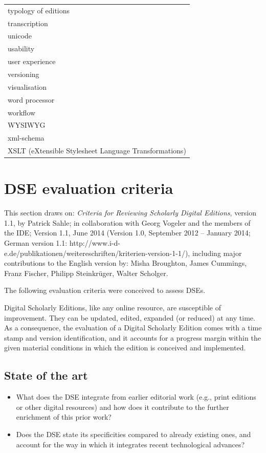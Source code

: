 \documentclass[
  letterpaper,
  DIV=11,
  numbers=noendperiod]{scrreprt}
\begin{document}
\begin{longtable}[]{@{}
  >{\raggedright\arraybackslash}p{}@{}}
typology of editions \\
transcription \\
unicode \\
usability \\
user experience \\
versioning \\
visualisation \\
word processor \\
workflow \\
WYSIWYG~ \\
xml-schema \\
XSLT (eXtensible Stylesheet Language Transformations) \\
\end{longtable}

\section{DSE evaluation criteria}\label{dse-evaluation-criteria}

This section draws on: \emph{Criteria for Reviewing Scholarly Digital
Editions}, version 1.1, by Patrick Sahle; in collaboration with Georg
Vogeler and the members of the IDE; Version 1.1, June 2014 (Version 1.0,
September 2012 -- January 2014; German version 1.1:
http://www.i-d-e.de/publikationen/weitereschriften/kriterien-version-1-1/),
including major contributions to the English version by: Misha
Broughton, James Cummings, Franz Fischer, Philipp Steinkrüger, Walter
Scholger.

The following evaluation criteria were conceived to assess DSEs.

Digital Scholarly Editions, like any online resource, are susceptible of
improvement. They can be updated, edited, expanded (or reduced) at any
time. As a consequence, the evaluation of a Digital Scholarly Edition
comes with a time stamp and version identification, and it accounts for
a progress margin within the given material conditions in which the
edition is conceived and implemented.

\subsection{\texorpdfstring{State of the
art\hl{}}{State of the art}}\label{state-of-the-art}

\begin{itemize}
\item
  What does the DSE integrate from earlier editorial work (e.g., print
  editions or other digital resources) and how does it contribute to the
  further enrichment of this prior work?
\item
  Does the DSE state its specificities compared to already existing
  ones, and account for the way in which it integrates recent
  technological advances?
\end{itemize}
\end{document}

